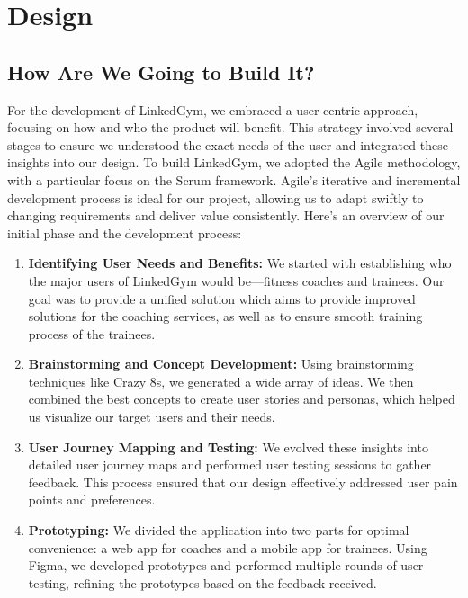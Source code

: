 \section{Design}
\label{sec:Design}

\subsection{How Are We Going to Build It?}
For the development of LinkedGym, we embraced a user-centric approach, focusing on how and who the product will benefit. This strategy involved several stages to ensure we understood the exact needs of the user and integrated these insights into our design. To build LinkedGym, we adopted the Agile methodology, with a particular focus on the Scrum framework. Agile's iterative and incremental development process is ideal for our project, allowing us to adapt swiftly to changing requirements and deliver value consistently. Here's an overview of our initial phase and the development process:

\begin{enumerate}
  \item \textbf{Identifying User Needs and Benefits:} We started with establishing who the major users of LinkedGym would be—fitness coaches and trainees. Our goal was to provide a unified solution which aims to provide improved solutions for the coaching services, as well as to ensure smooth training process of the trainees.
  
  \item \textbf{Brainstorming and Concept Development:} Using brainstorming techniques like Crazy 8s, we generated a wide array of ideas. We then combined the best concepts to create user stories and personas, which helped us visualize our target users and their needs.
  
  \item \textbf{User Journey Mapping and Testing:} We evolved these insights into detailed user journey maps and performed user testing sessions to gather feedback. This process ensured that our design effectively addressed user pain points and preferences.
  
  \item \textbf{Prototyping:} We divided the application into two parts for optimal convenience: a web app for coaches and a mobile app for trainees. Using Figma, we developed prototypes and performed multiple rounds of user testing, refining the prototypes based on the feedback received.
\end{enumerate}

